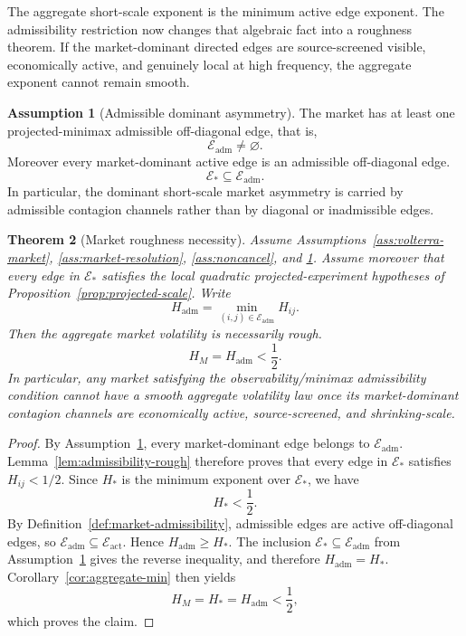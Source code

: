 \documentclass[11pt,a4paper]{amsart}
\theoremstyle{plain}
\newtheorem{theorem}{Theorem}[section]
\theoremstyle{definition}
\newtheorem{assumption}[theorem]{Assumption}
\theoremstyle{remark}
\newcommand{\cE}{\mathcal{E}}
\begin{document}
The aggregate short-scale exponent is the minimum active edge exponent.  The admissibility
restriction now changes that algebraic fact into a roughness theorem.  If the market-dominant
directed edges are source-screened visible, economically active, and genuinely local at high
frequency, the aggregate exponent cannot remain smooth.

\begin{assumption}[Admissible dominant asymmetry]\label{ass:admissible-asymmetry}
The market has at least one projected-minimax admissible off-diagonal edge, that is,
\[
        \cE_{\mathrm{adm}}\neq\varnothing.
\]
Moreover every market-dominant active edge is an admissible off-diagonal edge.
\[
\cE_*
\subseteq
\cE_{\mathrm{adm}}.
\]
In particular, the dominant short-scale market asymmetry is carried by admissible contagion
channels rather than by diagonal or inadmissible edges.
\end{assumption}

\begin{theorem}[Market roughness necessity]\label{thm:market-roughness}
Assume Assumptions~\ref{ass:volterra-market}, \ref{ass:market-resolution}, \ref{ass:noncancel}, and
\ref{ass:admissible-asymmetry}.  Assume moreover that every edge in \(\cE_*\) satisfies the local
quadratic projected-experiment hypotheses of Proposition~\ref{prop:projected-scale}.  Write
\[
        H_{\mathrm{adm}}
        =
        \min_{(i,j)\in\cE_{\mathrm{adm}}} H_{ij}.
\]
Then the aggregate market volatility is necessarily rough.
\[
        H_M
        =
        H_{\mathrm{adm}}
        <
        \frac12.
\]
In particular, any market satisfying the observability/minimax admissibility condition
cannot have a smooth aggregate volatility law once its market-dominant contagion channels are
economically active, source-screened, and shrinking-scale.
\end{theorem}

\begin{proof}
By Assumption~\ref{ass:admissible-asymmetry}, every market-dominant edge belongs to
\(\cE_{\mathrm{adm}}\).  Lemma~\ref{lem:admissibility-rough} therefore proves that every edge in
\(\cE_*\) satisfies \(H_{ij}<1/2\).  Since \(H_*\) is the minimum exponent over \(\cE_*\), we have
\[
        H_*
        <
        \frac12.
\]
By Definition~\ref{def:market-admissibility}, admissible edges are active off-diagonal edges, so
\(\cE_{\mathrm{adm}}\subseteq\cE_{\mathrm{act}}\).  Hence \(H_{\mathrm{adm}}\ge H_*\).  The inclusion
\(\cE_*\subseteq\cE_{\mathrm{adm}}\) from Assumption~\ref{ass:admissible-asymmetry} gives the
reverse inequality, and therefore \(H_{\mathrm{adm}}=H_*\).  Corollary~\ref{cor:aggregate-min} then yields
\[
        H_M
        =
        H_*
        =
        H_{\mathrm{adm}}
        <
        \frac12,
\]
which proves the claim.
\end{proof}
\end{document}
